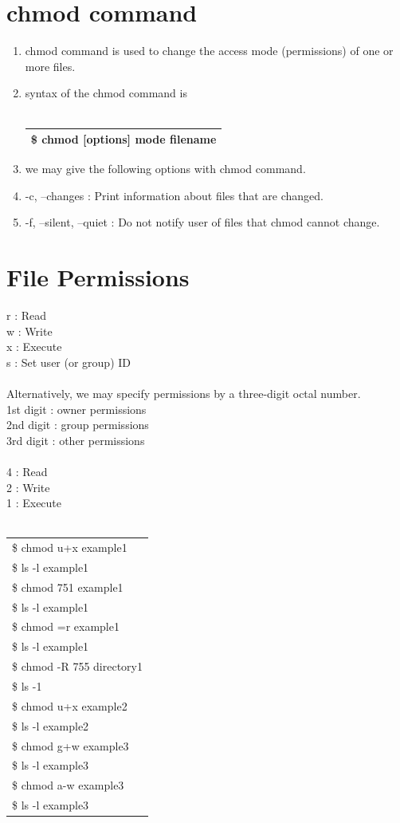 \documentclass[12pt, a4paper]{report}
\begin{document}
\section{chmod command}
\begin{enumerate}
\item chmod command is used to change the access mode (permissions) of one or more files.
\item syntax of the chmod command is \\
\\
\begin{tabular}{|l|}\hline
\$ chmod [options] mode filename \\ \hline
\end{tabular}
\item we may give the following options with chmod command.
\item-c, --changes : Print information about files that are changed.
\item -f, --silent, --quiet : Do not notify user of files that chmod cannot change.
\end{enumerate}
\section{File Permissions}
r : Read\\
w : Write\\
x : Execute\\
s : Set user (or group) ID\\\\
Alternatively, we may specify permissions by a three-digit octal number.\\
1st digit : owner permissions\\
2nd digit : group permissions\\
3rd digit : other permissions\\\\
4 : Read\\
2 : Write\\
1 : Execute\\
\\
\begin{tabular}{|l|}\hline
	\$ chmod u+x example1\\
	\$ ls -l example1\\
	\$ chmod 751 example1\\
	\$ ls -l example1\\
	\$ chmod =r example1\\
	\$ ls -l example1\\
	\$ chmod -R 755 directory1\\
	\$ ls -1\\
	\$ chmod u+x example2\\
	\$ ls -l example2\\
	\$ chmod g+w example3\\
	\$ ls -l example3\\
	\$ chmod a-w example3\\
	\$ ls -l example3\\ \hline
\end{tabular}
\end{document}
